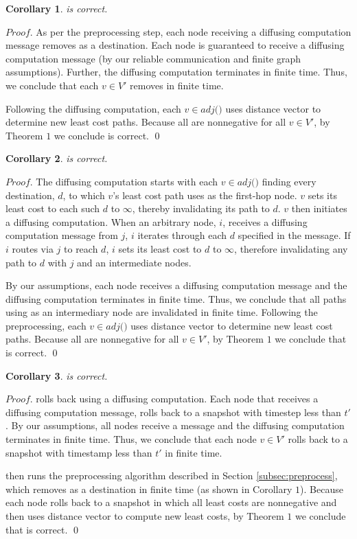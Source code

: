 {\bf Corollary 1}. {\it \second is correct.}

$Proof$. As per the preprocessing step, each node receiving a diffusing computation message removes \bad as a destination. 
Each node is guaranteed to receive a diffusing computation message (by our reliable communication and finite graph assumptions). Further, the diffusing computation
terminates in finite time.  Thus, we conclude that each $v \in V'$ removes \bad in finite time.

Following the diffusing computation, each $v \in adj($\bads$)$ uses distance vector to determine new least cost paths.
Because all \dmatrixv are nonnegative for all $v \in V'$, by Theorem $1$ we conclude \second is correct. \qed

{\bf Corollary 2}. {\it \purge is correct.}

$Proof$. The diffusing computation starts with each $v \in adj($\bads$)$ finding every destination, $d$, to which $v$'s least cost path 
uses \bad as the first-hop node. $v$ sets its least cost to each such $d$ to $\infty$, thereby invalidating its path to $d$.  
$v$ then initiates a diffusing computation. When an arbitrary node, $i$, receives a diffusing computation message from $j$, $i$ iterates 
through each $d$ specified in the message. If
$i$ routes via $j$ to reach $d$, $i$ sets its least cost to $d$ to $\infty$, therefore invalidating any path to $d$ with $j$ and  
\bad an intermediate nodes.  

By our assumptions, each node receives a diffusing computation message and the diffusing computation terminates in finite time. Thus, we conclude that all paths using \bad as an intermediary
node are invalidated in finite time. Following the preprocessing, each $v \in adj($\bads$)$ uses distance vector to determine new least cost paths.
Because all \dmatrixv are nonnegative for all $v \in V'$, by Theorem $1$ we conclude that \purge is correct. \qed

{\bf Corollary 3}. {\it \cpr is correct.}

$Proof$. \cpr rolls back using a diffusing computation. Each node that receives a diffusing computation message, rolls back to a snapshot with timestep less than $t'$.
By our assumptions, all nodes receive a message and the diffusing computation terminates in finite time.  Thus, we conclude
that each node $v \in V'$ rolls back to a snapshot with timestamp less than $t'$ in finite time.

\cpr then runs the preprocessing algorithm described in Section \ref{subsec:preprocess}, which removes \bad as a destination in finite time (as shown
in Corollary $1$). Because each node rolls back to a snapshot in which all least costs are nonnegative and 
\cpr then uses distance vector to compute new least costs, by Theorem $1$ we conclude that \cpr is correct. \qed

